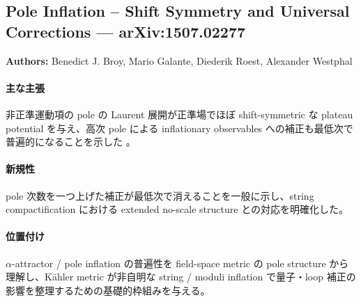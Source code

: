 \subsection{Pole Inflation -- Shift Symmetry and Universal Corrections --- arXiv:1507.02277}

\textbf{Authors:} Benedict J. Broy, Mario Galante, Diederik Roest, Alexander Westphal

\paragraph{主な主張}
非正準運動項の pole の Laurent 展開が正準場でほぼ shift-symmetric な plateau potential を与え、高次 pole による inflationary observables への補正も最低次で普遍的になることを示した \cite{Broy:2015pole}。

\paragraph{新規性}
pole 次数を一つ上げた補正が最低次で消えることを一般に示し、string compactification における extended no-scale structure との対応を明確化した。

\paragraph{位置付け}
$\alpha$-attractor / pole inflation の普遍性を field-space metric の pole structure から理解し、K\"ahler metric が非自明な string / moduli inflation で量子・loop 補正の影響を整理するための基礎的枠組みを与える。

